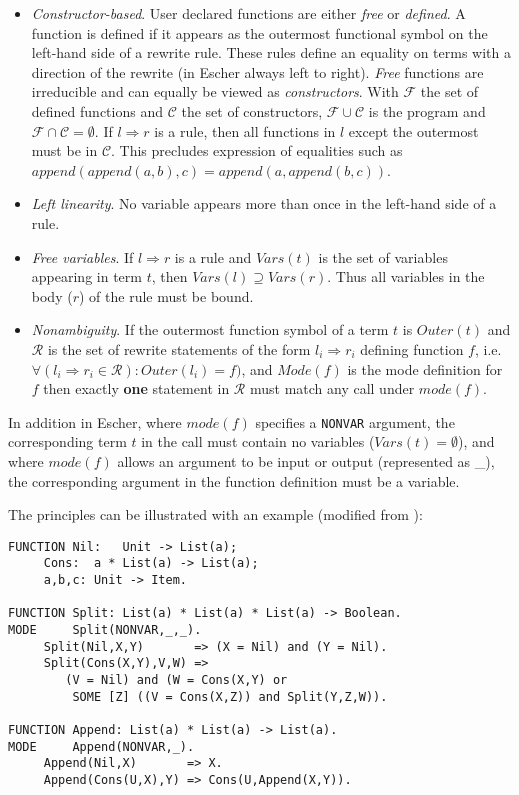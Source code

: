 \begin{itemize}

\item{\textit{Constructor-based}. 
  User declared functions are either \textit{free} or \textit{defined}.  A function is defined if
  it appears as the outermost functional symbol on the left-hand side of a rewrite rule.
  These rules define an equality on terms
  with a direction of the rewrite (in Escher always left to right).
  \textit{Free} functions are irreducible and can
  equally be viewed as \textit{constructors}.  With $\mathcal{F}$ the set of defined functions
  and $\mathcal{C}$
  the set of constructors, $\mathcal{F} \cup \mathcal{C}$ is the program and
  $\mathcal{F} \cap \mathcal{C} = \emptyset$.
  If $l \Rightarrow r$ is a rule, then all
  functions in $l$ except the outermost must be in $\mathcal{C}$.
  This precludes expression of equalities such as
  $\mathit{append}(\mathit{append}(a,b),c) = \mathit{append}(a,\mathit{append}(b,c))$.
  }
\item{\textit{Left linearity}.
  No variable appears more than once in the left-hand side of a rule.
  }
\item{\textit{Free variables}.  If $l \Rightarrow r$ is a rule and $Vars(t)$ is the set of
  variables appearing in term $t$, then $\mathit{Vars}(l) \supseteq \mathit{Vars}(r)$.
  Thus all variables in the
  body ($r$) of the rule must be bound.
  }
\item{\textit{Nonambiguity}.  
  If the outermost function symbol of a term $t$ is $\mathit{Outer}(t)$ and
  $\mathcal{R}$ is the set of rewrite statements of the form
  $l_i \Rightarrow r_i$ defining function $f$, i.e. $\forall (l_i \Rightarrow r_i \in
  \mathcal{R}): \mathit{Outer}(l_i) = f)$, and $\mathit{Mode}(f)$ is the mode definition for
  $f$ then exactly \textbf{one} statement in $\mathcal{R}$ must match any call under
  $mode(f)$.
  }

\end{itemize}

In addition in Escher,  where $\mathit{mode}(f)$ specifies a \texttt{NONVAR} argument, the
corresponding term $t$ in the call must contain no variables ($\mathit{Vars}(t) = \emptyset$),
and where $\mathit{mode}(f)$ allows an argument to be input or output (represented as \_), the
corresponding argument in the function definition must be a variable.

The principles can be illustrated with an example (modified from \cite{Llo94}):

\noindent
\hrulefill
\begin{verbatim}
FUNCTION Nil:   Unit -> List(a);
	 Cons:  a * List(a) -> List(a);
	 a,b,c: Unit -> Item.

FUNCTION Split: List(a) * List(a) * List(a) -> Boolean.
MODE     Split(NONVAR,_,_).
	 Split(Nil,X,Y)       => (X = Nil) and (Y = Nil).
	 Split(Cons(X,Y),V,W) => 
	    (V = Nil) and (W = Cons(X,Y) or
	     SOME [Z] ((V = Cons(X,Z)) and Split(Y,Z,W)).

FUNCTION Append: List(a) * List(a) -> List(a).
MODE     Append(NONVAR,_).
	 Append(Nil,X)       => X.
	 Append(Cons(U,X),Y) => Cons(U,Append(X,Y)).
\end{verbatim}
\hrulefill

